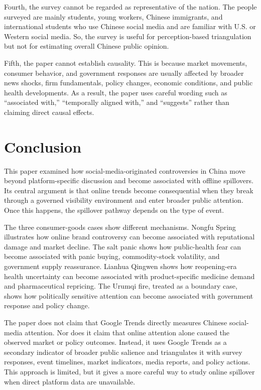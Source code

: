 \documentclass[conference]{IEEEtran}
\begin{document}
Fourth, the survey cannot be regarded as representative of the nation. The people surveyed are mainly students, young workers, Chinese immigrants, and international students who use Chinese social media and are familiar with U.S. or Western social media. So, the survey is useful for perception-based triangulation but not for estimating overall Chinese public opinion.

Fifth, the paper cannot establish causality. This is because market movements, consumer behavior, and government responses are usually affected by broader news shocks, firm fundamentals, policy changes, economic conditions, and public health developments. As a result, the paper uses careful wording such as ``associated with,'' ``temporally aligned with,'' and ``suggests'' rather than claiming direct causal effects.

\section{Conclusion}
This paper examined how social-media-originated controversies in China move beyond platform-specific discussion and become associated with offline spillovers. Its central argument is that online trends become consequential when they break through a governed visibility environment and enter broader public attention. Once this happens, the spillover pathway depends on the type of event.

The three consumer-goods cases show different mechanisms. Nongfu Spring illustrates how online brand controversy can become associated with reputational damage and market decline. The salt panic shows how public-health fear can become associated with panic buying, commodity-stock volatility, and government supply reassurance. Lianhua Qingwen shows how reopening-era health uncertainty can become associated with product-specific medicine demand and pharmaceutical repricing. The Urumqi fire, treated as a boundary case, shows how politically sensitive attention can become associated with government response and policy change.

The paper does not claim that Google Trends directly measures Chinese social-media attention. Nor does it claim that online attention alone caused the observed market or policy outcomes. Instead, it uses Google Trends as a secondary indicator of broader public salience and triangulates it with survey responses, event timelines, market indicators, media reports, and policy actions. This approach is limited, but it gives a more careful way to study online spillover when direct platform data are unavailable.
\end{document}

